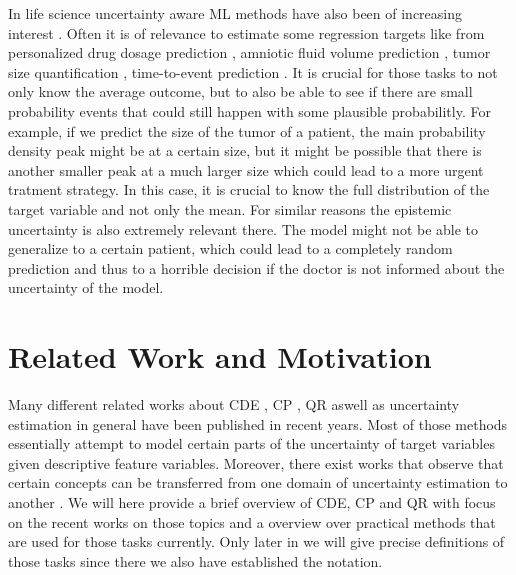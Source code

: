 In life science uncertainty aware ML methods have also been of increasing interest \cite{loftus2022uncertainty, lambert2024trustworthy}. Often it is of relevance to estimate some regression targets like from personalized drug dosage prediction \cite{wu2023application}, amniotic fluid volume prediction \cite{csillag2023amnioml}, tumor size quantification \cite{prasad2023tumor}, time-to-event prediction \cite{kvamme2019time, sloma2021empirical}. It is crucial for those tasks to not only know the average outcome, but to also be able to see if there are small probability events that could still happen with some plausible probabilitly. For example, if we predict the size of the tumor of a patient, the main probability density peak might be at a certain size, but it might be possible that there is another smaller peak at a much larger size which could lead to a more urgent tratment strategy. In this case, it is crucial to know the full distribution of the target variable and not only the mean. For similar reasons the epistemic uncertainty is also extremely relevant there. The model might not be able to generalize to a certain patient, which could lead to a completely random prediction and thus to a horrible decision if the doctor is not informed about the uncertainty of the model.

\section{Related Work and Motivation}\label{sec:motivation}

Many different related works about CDE \cite{bishop1994mixture, rothfuss2019conditional, trippe2018conditional, rothfuss2019noise, ambrogioni2017kernel}, CP \cite{izbicki2022cd, chernozhukov2021distributional,romano2019conformalized, Papadopoulos08, angelopoulos2021gentle}, QR \cite{chung2020beyond} aswell as uncertainty estimation in general \cite{gal_dropout_2016, hullermeier_aleatoric_2021, abdar2021review, klotz2021uncertainty} have been published in recent years. Most of those methods essentially attempt to model certain parts of the uncertainty of target variables given descriptive feature variables. Moreover, there exist works that observe that certain concepts can be transferred from one domain of uncertainty estimation to another \cite{chernozhukov2021distributional}.
We will here provide a brief overview of CDE, CP and QR with focus on the recent works on those topics and a overview over practical methods that are used for those tasks currently. Only later in  we will give precise definitions of those tasks since there we also have established the notation.

